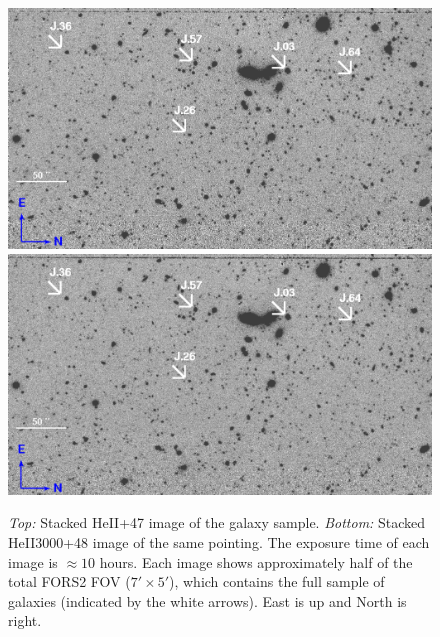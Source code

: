 \documentclass[twocolumn]{aastex62}
\begin{document}
\begin{figure}[ht!]
\centering
\includegraphics[scale=.61]{HEII_final.png}
\includegraphics[scale=.61]{HEII3000_final.png}
\caption{\emph{Top:} Stacked HeII+47 image of the galaxy sample. \emph{Bottom:} Stacked HeII3000+48 image of the same pointing. The exposure time of each image is $\approx 10$ hours. Each image shows approximately half of the total FORS2 FOV ($7' \times 5'$), which contains the full sample of galaxies (indicated by the white arrows). East is up and North is right.
\label{fig:stacked_image}}
\end{figure}
\end{document}

